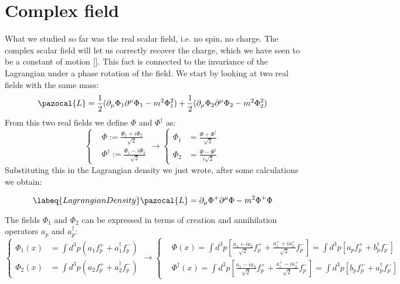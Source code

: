 \documentclass[../main.tex]{subfiles}
\begin{document}
\section{Complex field}
What we studied so far was the real scalar field, i.e. no spin, no charge. The complex scalar field will let us correctly recover the charge, which we have seen to be a constant of motion []. This fact is connected to the invariance of the Lagrangian under a phase rotation of the field. We start by looking at two real fields with the same mass:
\[
\pazocal{L}=\frac{1}{2}(\partial_\mu\Phi_1\partial^\mu\Phi_1-m^2\Phi_1^2)+\frac{1}{2}(\partial_\mu\Phi_2\partial^\mu\Phi_2-m^2\Phi_2^2)
\]
From this two real fields we define $\Phi$ and $\Phi^\dagger$ as:
\[
\left\{
\begin{aligned}
&\Phi:=\frac{\Phi_1+i\Phi_2}{\sqrt{2}}\\
&\Phi^\dagger:=\frac{\Phi_1-i\Phi_2}{\sqrt{2}}
\end{aligned}
\right.
\xrightarrow[]{}
\left\{
\begin{aligned}
\Phi_1&=\frac{\Phi+\Phi^\dagger}{\sqrt{2}}\\
\Phi_2&=\frac{\Phi-\Phi^\dagger}{i\sqrt{2}}
\end{aligned}
\right.
\]
Substituting this in the Lagrangian density we just wrote, after some calculations we obtain:
\begin{kaobox}[frametitle=Lagrangian density for a complex field]
\begin{equation}
\labeq{LagrangianDensity}
\pazocal{L}=\partial_\mu\Phi^+\partial^\mu\Phi-m^2\Phi^+\Phi
\end{equation}
\end{kaobox}
The fields $\Phi_1$ and $\Phi_2$ can be expressed in terms of creation and annihilation operators $a_p$ and $a_p^\dagger$:
\[
\left\{
\begin{aligned}
\Phi_1(x)&=\int d^3p(a_1f^+_p+a_1^\dagger f^-_p)\\
\Phi_2(x)&=\int d^3p(a_2f^+_p+a_2^\dagger f^-_p)
\end{aligned}
\right.
\xrightarrow[]{}
\left\{
\begin{aligned}
&\Phi(x)=\int d^3p\left[\frac{a_1+ia_2}{\sqrt{2}}f^+_p+\frac{a_1^++ia_2^+}{\sqrt{2}}f^-_p\right]=\int d^3p\left[a_pf^+_p+b^\dagger_pf^-_p\right]\\
&\Phi^\dagger(x)=\int d^3p\left[\frac{a_1-ia_2}{\sqrt{2}}f^+_p+\frac{a_1^+-ia_2^+}{\sqrt{2}}f^-_p\right]=\int d^3p\left[b_pf^+_p+a^\dagger_pf^-_p\right]
\end{aligned}
\right.
\]
\end{document}
